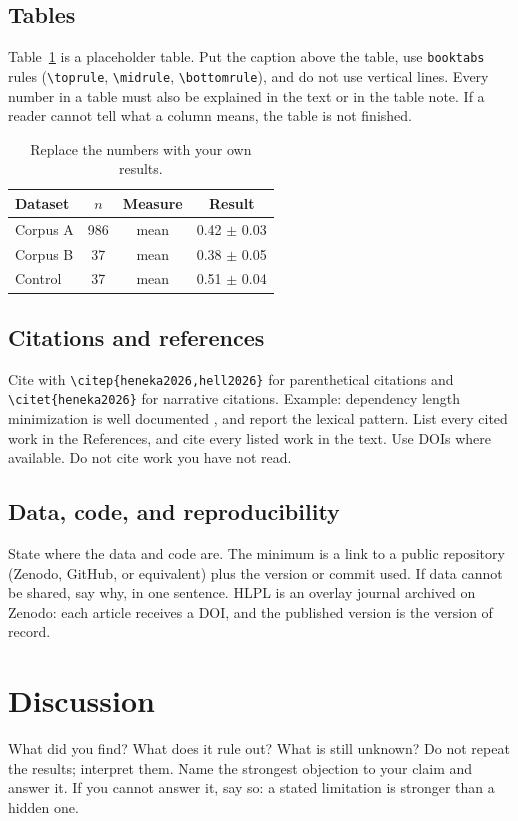 \documentclass[9pt,a4paper,twocolumn]{article}
\begin{document}
\subsection{Tables}
Table~\ref{tab:example} is a placeholder table. Put the caption above the table, use \verb|booktabs| rules (\verb|\toprule|, \verb|\midrule|, \verb|\bottomrule|), and do not use vertical lines. Every number in a table must also be explained in the text or in the table note. If a reader cannot tell what a column means, the table is not finished.

\begin{table}[h]
\centering
\caption{Replace the numbers with your own results.}
\label{tab:example}
\small
\begin{tabular}{@{}lccc@{}}
\toprule
\textbf{{Dataset}} & \textbf{{$n$}} & \textbf{{Measure}} & \textbf{{Result}} \\
\midrule
{Corpus A} & {986} & {mean} & {0.42 $\pm$ 0.03} \\
{Corpus B} & {37} & {mean} & {0.38 $\pm$ 0.05} \\
{Control}  & {37} & {mean} & {0.51 $\pm$ 0.04} \\
\bottomrule
\end{tabular}
\end{table}

\subsection{Citations and references} 
Cite with \verb|\citep{heneka2026,hell2026}| for parenthetical citations and \verb|\citet{heneka2026}| for narrative citations. Example: dependency length minimization is well documented \citep{papageorgakis2025}, and \citet{heneka2026} report the lexical pattern. List every cited work in the References, and cite every listed work in the text. Use DOIs where available. Do not cite work you have not read.

\subsection{Data, code, and reproducibility}
State where the data and code are. The minimum is a link to a public repository (Zenodo, GitHub, or equivalent) plus the version or commit used. If data cannot be shared, say why, in one sentence. HLPL is an overlay journal archived on Zenodo: each article receives a DOI, and the published version is the version of record.

\section{Discussion}
What did you find? What does it rule out? What is still unknown? Do not repeat the results; interpret them. Name the strongest objection to your claim and answer it. If you cannot answer it, say so: a stated limitation is stronger than a hidden one.
\end{document}
